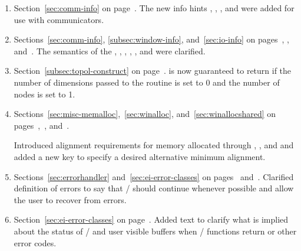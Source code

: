 \begin{enumerate}
\item
Section~\ref{sec:comm-info} on page~\pageref{sec:comm-info}.
\newline
The new info hints ,
, ,
and  were added for use with
communicators.

\item
Sections~\ref{sec:comm-info}, \ref{subsec:window-info}, and~\ref{sec:io-info}
on pages~\pageref{sec:comm-info}, \pageref{subsec:window-info},
and~\pageref{sec:io-info}.
\newline
The semantics of the
, ,
, ,
, and 
were clarified.

\item
Section~\ref{subsec:topol-construct} on page~\pageref{subsec:topol-construct}.
\newline
{} is now guaranteed to return  if the number of dimensions passed to the routine is set to 0 and the number of nodes is set to 1.

\item Sections~\ref{sec:misc-memalloc},~\ref{sec:winalloc}, and~\ref{sec:winallocshared} on
pages~\pageref{sec:misc-memalloc},~\pageref{sec:winalloc}, and~\pageref{sec:winallocshared}.
\newline
{\raggedright
Introduced alignment requirements for memory allocated through
, , and
 and added a new 
key  to specify a desired alternative minimum alignment.

}
\item
Sections~\ref{sec:errorhandler} and~\ref{sec:ei-error-classes} on
pages~\pageref{sec:errorhandler} and~\pageref{sec:ei-error-classes}.
\newline
Clarified definition of errors to say that \MPI/ should continue whenever
possible and allow the user to recover from errors.

\item
Section~\ref{sec:ei-error-classes} on page~\pageref{sec:ei-error-classes}.
\newline
Added text to clarify what is implied about the status of \MPI/ and user visible buffers when \MPI/
functions return  or other error codes.


\end{enumerate}
